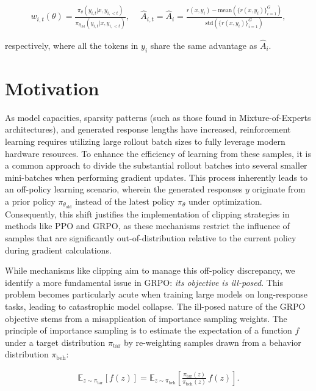 \begin{align}
    w_{i,t}(\theta)=\frac{ \pi_{\theta} (y_{i,t} | x, y_{i,<t}) }{ \pi_{\theta_\text{old}} (y_{i,t} | x,y_{i,<t})},\quad\ 
    \widehat{A}_{i,t} = \widehat{A}_{i} = \frac{r(x, y_i) - \mathrm{mean} \left( \{ r(x, y_i) \}_{i=1}^G \right) }{ \mathrm{std} \left( \{ r(x, y_i) \}_{i=1}^G \right) },
\end{align}

respectively, where all the tokens in $y_i$ share the same advantage as $\widehat{A}_{i}$.

\section{Motivation}
\label{sec:motivation}

As model capacities, sparsity patterns (such as those found in Mixture-of-Experts architectures), and generated response lengths have increased, reinforcement learning requires utilizing large rollout batch sizes to fully leverage modern hardware resources. To enhance the efficiency of learning from these samples, it is a common approach to divide the substantial rollout batches into several smaller mini-batches when performing gradient updates. This process inherently leads to an off-policy learning scenario, wherein the generated responses $y$ originate from a prior policy $\pi_{\theta_\text{old}}$ instead of the latest policy $\pi_\theta$ under optimization. Consequently, this shift justifies the implementation of clipping strategies in methods like PPO and GRPO, as these mechanisms restrict the influence of samples that are significantly out-of-distribution relative to the current policy during gradient calculations.

While mechanisms like clipping aim to manage this off-policy discrepancy, we identify a more fundamental issue in GRPO: \textit{its objective is ill-posed}. This problem becomes particularly acute when training large models on long-response tasks, leading to catastrophic model collapse. The ill-posed nature of the GRPO objective stems from a misapplication of importance sampling weights. The principle of importance sampling is to estimate the expectation of a function $f$ under a target distribution $\pi_\text{tar}$ by re-weighting samples drawn from a behavior distribution $\pi_\text{beh}$:

\begin{align}
\mathbb{E}_{z \sim \pi_\text{tar}} \left[ f(z) \right] = \mathbb{E}_{z \sim \pi_\text{beh}} \left[ \frac{ \pi_\text{tar} (z) }{ \pi_\text{beh} (z)} \, f(z) \right].
\end{align}

